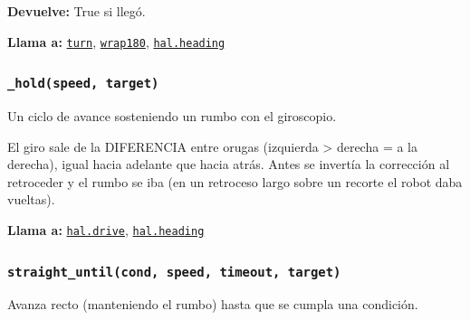 \par{}\par\smallskip
\noindent\textbf{Devuelve:} True si llegó.\par
\noindent\textbf{Llama a:} \hyperref[fn:motion:turn]{\texttt{turn}}, \hyperref[fn:motion:wrap180]{\texttt{wrap180}}, \hyperref[fn:hal:heading]{\texttt{hal.heading}}\par

\subsubsection{\texttt{\_\allowbreak{}hold(speed, target)}}\label{fn:motion:-hold}
\noindent Un ciclo de avance sosteniendo un rumbo con el giroscopio.

El giro sale de la DIFERENCIA entre orugas (izquierda > derecha = a la derecha), igual hacia adelante que hacia atrás. Antes se invertía la corrección al retroceder y el rumbo se iba (en un retroceso largo sobre un recorte el robot daba vueltas).

\par{}\par\smallskip
\noindent\textbf{Llama a:} \hyperref[fn:hal:drive]{\texttt{hal.drive}}, \hyperref[fn:hal:heading]{\texttt{hal.heading}}\par

\subsubsection{\texttt{straight\_\allowbreak{}until(cond, speed, timeout, target)}}\label{fn:motion:straight-until}
\noindent Avanza recto (manteniendo el rumbo) hasta que se cumpla una condición.

